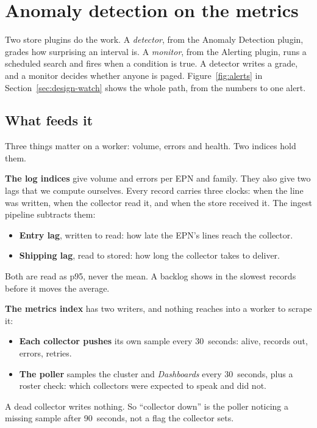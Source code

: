 \section{Anomaly detection on the metrics}\label{sec:metrics}

Two store plugins do the work. A \emph{detector}, from the Anomaly Detection plugin, grades how surprising an interval is. A \emph{monitor}, from the Alerting plugin, runs a scheduled search and fires when a condition is true. A detector writes a grade, and a monitor decides whether anyone is paged. Figure~\ref{fig:alerts} in Section~\ref{sec:design-watch} shows the whole path, from the numbers to one alert.

\subsection{What feeds it}\label{sec:metrics-inputs}

Three things matter on a worker: volume, errors and health. Two indices hold them.

\textbf{The log indices} give volume and errors per EPN and family. They also give two lags that we compute ourselves. Every record carries three clocks: when the line was written, when the collector read it, and when the store received it. The ingest pipeline subtracts them:

\begin{itemize}
\item \textbf{Entry lag}, written to read: how late the EPN's lines reach the collector.
\item \textbf{Shipping lag}, read to stored: how long the collector takes to deliver.
\end{itemize}

Both are read as p95, never the mean. A backlog shows in the slowest records before it moves the average.

\textbf{The metrics index} has two writers, and nothing reaches into a worker to scrape it:

\begin{itemize}
\item \textbf{Each collector pushes} its own sample every 30~seconds: alive, records out, errors, retries.
\item \textbf{The poller} samples the cluster and \textit{Dashboards} every 30~seconds, plus a roster check: which collectors were expected to speak and did not.
\end{itemize}

A dead collector writes nothing. So ``collector down'' is the poller noticing a missing sample after 90~seconds, not a flag the collector sets.

